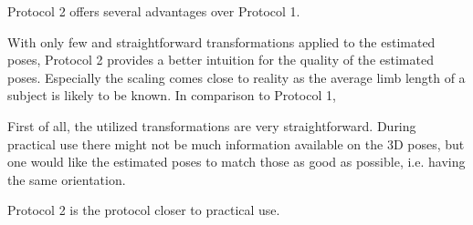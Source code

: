 Protocol 2 offers several advantages over Protocol 1.

With only few and straightforward transformations applied to the estimated poses, Protocol 2 provides a better intuition for the quality of the estimated poses.
Especially the scaling comes close to reality as the average limb length of a subject is likely to be known.
In comparison to Protocol 1, 

First of all, the utilized transformations are very straightforward.
During practical use there might not be much information available on the 3D poses, but one would like the estimated poses to match those as good as possible, i.e. having the same orientation.


Protocol 2 is the protocol closer to practical use.


